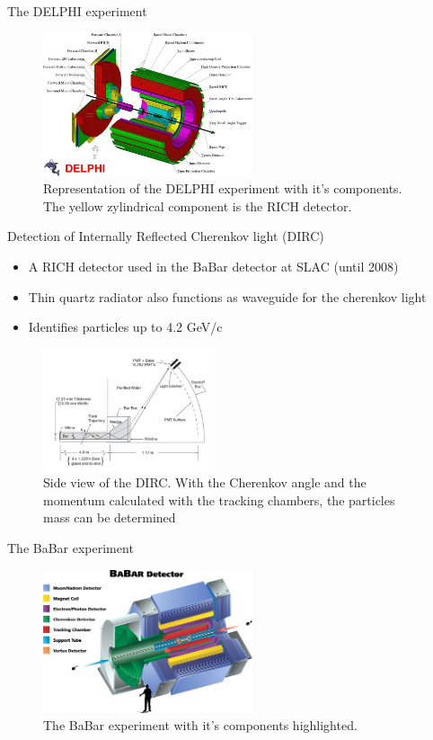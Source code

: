 \documentclass[aspectratio=1610, 10pt]{beamer}
\begin{document}
\begin{frame}{The DELPHI experiment}
  \begin{figure}
    \includegraphics[width=0.55\textwidth]{images/delphi.jpg}
    \caption{Representation of the DELPHI experiment with it's components. The yellow zylindrical component is the RICH detector.}
  \end{figure}
\end{frame}

\begin{frame}{Detection of Internally Reflected Cherenkov light (DIRC)}
  \begin{itemize}
    \item A RICH detector used in the BaBar detector at SLAC (until 2008)
    \medskip
    \item Thin quartz radiator also functions as waveguide for the cherenkov light
    \medskip
    \item Identifies particles up to 4.2 GeV/c
  \end{itemize}
  \begin{figure}
    \includegraphics[width=0.45\textwidth]{images/dirc.png}
    \caption{Side view of the DIRC. With the Cherenkov angle and the momentum calculated with the tracking chambers, the
    particles mass can be determined}
  \end{figure}
\end{frame}

\begin{frame}{The BaBar experiment}
  \begin{figure}
    \includegraphics[width=0.55\textwidth]{images/babar.jpg}
    \caption{The BaBar experiment with it's components highlighted.}
  \end{figure}
\end{frame}
\end{document}
